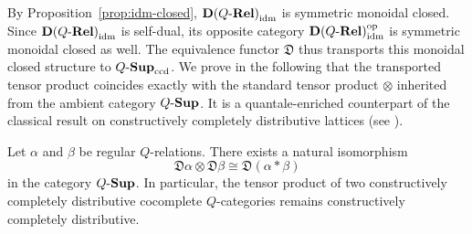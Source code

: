 \documentclass{tac}
\begin{document}
By Proposition~\ref{prop:idm-closed}, \({\mathbf{D}(Q\text{-}\mathbf{Rel})}_{\mathrm{idm}}\) is symmetric monoidal closed. Since \({\mathbf{D}(Q\text{-}\mathbf{Rel})}_{\mathrm{idm}}\) is self-dual, its opposite category \({\mathbf{D}(Q\text{-}\mathbf{Rel})}_{\mathrm{idm}}^{\mathrm{op}}\) is symmetric monoidal closed as well. The equivalence functor $\mathfrak{D}$ thus transports this monoidal closed structure to ${Q\text{-}\mathbf{Sup}}_{\mathrm{ccd}}$. We prove in the following that the transported tensor product coincides exactly with the standard tensor product $\otimes$ inherited from the ambient category ${Q\text{-}\mathbf{Sup}}$. It is a quantale-enriched counterpart of the classical result on constructively completely distributive lattices (see \cite[Theorem 6.3]{KenneyWood2010}).

\begin{theorem}\label{thm:main}
Let $\alpha$ and $\beta$ be regular $Q$-relations. There exists a natural isomorphism
\[
\mathfrak{D}\alpha\otimes\mathfrak{D}\beta\cong\mathfrak{D}(\alpha*\beta)
\]
in the category ${Q\text{-}\mathbf{Sup}}$. In particular, the tensor product of two constructively completely distributive cocomplete $Q$-categories remains constructively completely distributive.
\end{theorem}
\end{document}
